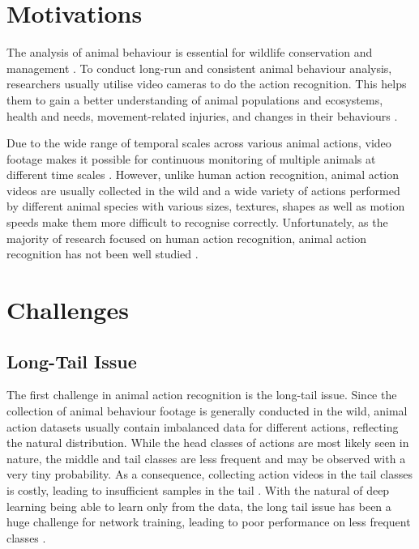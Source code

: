 \section{Motivations}
The analysis of animal behaviour is essential for wildlife conservation and management \parencite{Greggor2019, singh2020animal}. To conduct long-run and consistent animal behaviour analysis, researchers usually utilise video cameras to do the action recognition. This helps them to gain a better understanding of animal populations and ecosystems, health and needs, movement-related injuries, and changes in their behaviours \parencite{ng2022animal, Giersberg:2022aa, 8259762}.

Due to the wide range of temporal scales across various animal actions, video footage makes it possible for continuous monitoring of multiple animals at different time scales \parencite{ANDERSON201418}. However, unlike human action recognition, animal action videos are usually collected in the wild and a wide variety of actions performed by different animal species with various sizes, textures, shapes as well as motion speeds make them more difficult to recognise correctly. Unfortunately, as the majority of research focused on human action recognition, animal action recognition has not been well studied \parencite{mondal2023msqnet}.

\section{Challenges}
\subsection{Long-Tail Issue}
The first challenge in animal action recognition is the long-tail issue. Since the collection of animal behaviour footage is generally conducted in the wild, animal action datasets usually contain imbalanced data for different actions, reflecting the natural distribution. While the head classes of actions are most likely seen in nature, the middle and tail classes are less frequent and may be observed with a very tiny probability. As a consequence, collecting action videos in the tail classes is costly, leading to insufficient samples in the tail \parencite{ng2022animal, perrett2023use}. With the natural of deep learning being able to learn only from the data, the long tail issue has been a huge challenge for network training, leading to poor performance on less frequent classes \parencite{cao2019learning, zhang2021videolt}.

